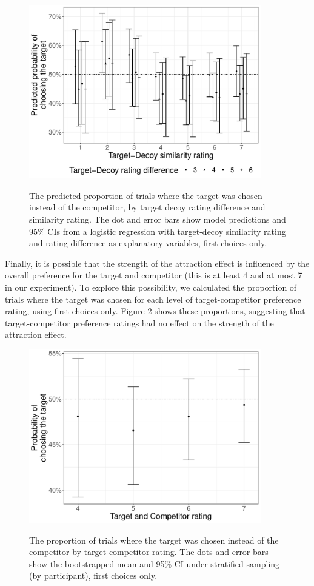 \documentclass[12pt, a4paper]{article}
\begin{document}
\begin{figure}[htb!]
\centering
		\caption{The predicted proportion of trials where the target was chosen instead of the competitor, by target decoy rating difference and similarity rating. The dot and error bars show model predictions and 95\% CIs from a logistic regression with target-decoy similarity rating and rating difference as explanatory variables, first choices only.}
\includegraphics[width=0.9\textwidth]{figure6.pdf}
\label{fig:TD_fig}
\end{figure}

Finally, it is possible that the strength of the attraction effect is influenced by the overall preference for the target and competitor (this is at least 4 and at most 7 in our experiment). To explore this possibility, we calculated the proportion of trials where the target was chosen for each level of target-competitor preference rating, using first choices only. Figure \ref{fig:TC_fig} shows these proportions, suggesting that target-competitor preference ratings had no effect on the strength of the attraction effect. 




\begin{figure}[htb!]
\centering
		\caption{The proportion of trials where the target was chosen instead of the competitor by target-competitor rating. The dots and error bars show the bootstrapped mean and 95\% CI under stratified sampling (by participant), first choices only.}
\includegraphics[width=0.9\textwidth]{figure7.pdf}
\label{fig:TC_fig}
\end{figure}
\end{document}
